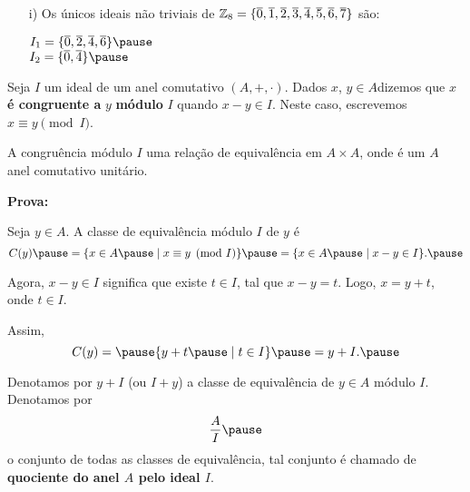 \documentclass{beamer}
\begin{document}
    \begin{frame}
        \begin{exemplos}
            \begin{enumerate}
                \item[i)] Os {\'u}nicos ideais n{\~a}o triviais de \pause $\mathbb{Z}_8 = \{\overline{0}, \overline{1}, \overline{2}, \overline{3}, \overline{4}, \overline{5}, \overline{6}, \overline{7}\}$ s{\~a}o:\pause
                \begin{center}
                    $I_1 = \{\overline{0}, \overline{2}, \overline{4}, \overline{6}\}\pause$\\
                    $I_2 =\{\overline{0}, \overline{4}\}\pause$
                \end{center}
            \end{enumerate}
        \end{exemplos}
    \end{frame}

    \begin{frame}
        \begin{definicao}
            Seja $I$ um ideal \pause de um anel comutativo $(A, +, \cdot)$. \pause Dados $x$, $y \in A$\pause dizemos que $x$ \textbf{\'e congruente a} $y$ \pause \textbf{m\'odulo} $I$ \pause quando $x - y \in I$. \pause Neste caso, escrevemos $x\equiv y \pmod I$.\pause
        \end{definicao}

        \begin{proposicao}
            A congru{\^e}ncia m{\'o}dulo $I$  uma rela{\c c}{\~a}o de equival{\^e}ncia em $A \times A$, \pause onde \'e um $A$ anel comutativo unit{\'a}rio.\pause
        \end{proposicao}
        \noindent \textbf{Prova:}

        \vspace{3cm}
    \end{frame}

    \begin{frame}
        Seja $y \in A$. \pause A classe de equival{\^e}ncia m{\'o}dulo $I$ \pause de $y$ {\'e}\pause 
        \[
            C(y) \pause = \{x \in A \pause \mid x\equiv y \pmod I\} \pause = \{x \in A \pause \mid x - y \in I\}.\pause
        \]

        Agora, $x - y \in I$ \pause significa que existe $t \in I$, \pause tal que $x - y = t$. \pause Logo, $x = y + t$, \pause onde $t \in I$.\pause

        Assim,\pause
        \[
            C(y) = \pause \{y + t\pause \mid t \in I\} \pause = y + I.\pause
        \]

        \begin{observacao}
            Denotamos por $y + I$ \pause (ou $I + y$) \pause a classe de equival{\^e}ncia de $y \in A$ \pause m{\'o}dulo $I$. \pause Denotamos por \pause 
            \[
                \dfrac{A}{I}\pause 
            \]
            o conjunto de todas as classes de equival{\^e}ncia, \pause tal conjunto {\'e} chamado de \textbf{quociente do anel $A$ pelo ideal $I$}.\pause
        \end{observacao}
    \end{frame}
\end{document}
